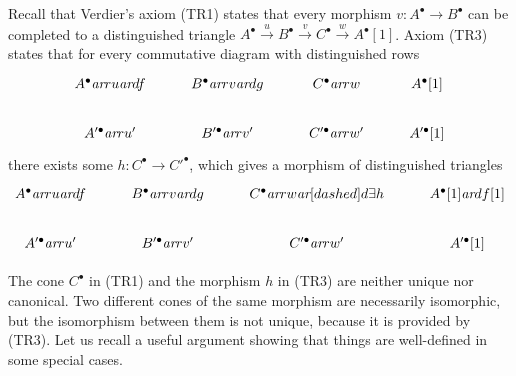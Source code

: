\documentclass[leqno,12pt]{article}
\theoremstyle{plain}
\theoremstyle{definition}
\newcommand{\ar}{\text{\it ar}}
\begin{document}
Recall that Verdier's axiom (TR1) states that every morphism
$v\colon A^\bullet \to B^\bullet$ can be completed to a distinguished triangle
$A^\bullet \xrightarrow{u} B^\bullet \xrightarrow{v} C^\bullet \xrightarrow{w}
A^\bullet [1]$. Axiom (TR3) states that for every commutative diagram with
distinguished rows
\begin{equation}
  \label{eqn:TR3-input}
  \begin{tikzcd}
    A^\bullet\ar{r}{u}\ar{d}{f} & B^\bullet\ar{r}{v}\ar{d}{g} & C^\bullet\ar{r}{w} & A^\bullet [1] \\
    A'^\bullet\ar{r}{u'} & B'^\bullet\ar{r}{v'} & C'^\bullet\ar{r}{w'} & A'^\bullet [1]
  \end{tikzcd}
\end{equation}
there exists some $h\colon C^\bullet \to C'^\bullet$, which gives a morphism of
distinguished triangles
\begin{equation}
  \label{eqn:TR3-output}
  \begin{tikzcd}
    A^\bullet\ar{r}{u}\ar{d}{f} & B^\bullet\ar{r}{v}\ar{d}{g} & C^\bullet\ar{r}{w}\ar[dashed]{d}{\exists h} & A^\bullet [1]\ar{d}{f [1]} \\
    A'^\bullet\ar{r}{u'} & B'^\bullet\ar{r}{v'} & C'^\bullet\ar{r}{w'} & A'^\bullet [1]
  \end{tikzcd}
\end{equation}

The cone $C^\bullet$ in (TR1) and the morphism $h$ in (TR3) are neither unique
nor canonical. Two different cones of the same morphism are necessarily
isomorphic, but the isomorphism between them is not unique, because it is
provided by (TR3). Let us recall a useful argument showing that things are
well-defined in some special cases.
\end{document}
